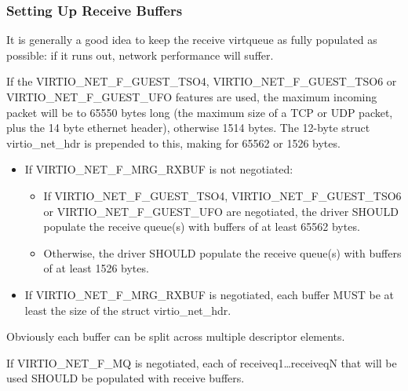 \subsubsection{Setting Up Receive Buffers}\label{sec:Device Types / Network Device / Device Operation / Setting Up Receive Buffers}

It is generally a good idea to keep the receive virtqueue as
fully populated as possible: if it runs out, network performance
will suffer.

If the VIRTIO_NET_F_GUEST_TSO4, VIRTIO_NET_F_GUEST_TSO6 or
VIRTIO_NET_F_GUEST_UFO features are used, the maximum incoming packet
will be to 65550 bytes long (the maximum size of a
TCP or UDP packet, plus the 14 byte ethernet header), otherwise
1514 bytes.  The 12-byte struct virtio_net_hdr is prepended to this,
making for 65562 or 1526 bytes.


\begin{itemize}
\item If VIRTIO_NET_F_MRG_RXBUF is not negotiated:
  \begin{itemize}
    \item If VIRTIO_NET_F_GUEST_TSO4, VIRTIO_NET_F_GUEST_TSO6 or
      VIRTIO_NET_F_GUEST_UFO are negotiated, the driver SHOULD populate
      the receive queue(s) with buffers of at least 65562 bytes.
    \item Otherwise, the driver SHOULD populate the receive queue(s)
      with buffers of at least 1526 bytes.
  \end{itemize}
\item If VIRTIO_NET_F_MRG_RXBUF is negotiated, each buffer MUST be at
least the size of the struct virtio_net_hdr.
\end{itemize}

\begin{note}
Obviously each buffer can be split across multiple descriptor elements.
\end{note}

If VIRTIO_NET_F_MQ is negotiated, each of receiveq1\ldots receiveqN
that will be used SHOULD be populated with receive buffers.


